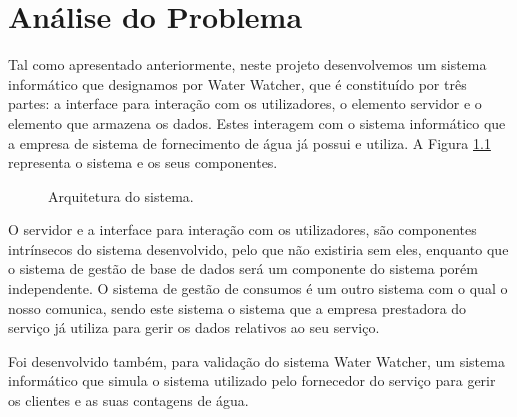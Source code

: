 \chapter{Análise do Problema} \label{cap:analise}

Tal como apresentado anteriormente, neste projeto desenvolvemos um sistema informático que designamos por Water Watcher, que é constituído por três partes: a interface para interação com os utilizadores, o elemento servidor e o elemento que armazena os dados. Estes interagem com o sistema informático que a empresa de sistema de fornecimento de água já possui e utiliza. A Figura \ref{fig:modelo} representa o sistema e os seus componentes.

\begin{figure}[ht!]
\centering
{}
\caption{Arquitetura do sistema.}
\label{fig:modelo}
\end{figure}

 O servidor e a interface para interação com os utilizadores, são componentes intrínsecos do sistema desenvolvido, pelo que não existiria sem eles, enquanto que o sistema de gestão de base de dados será um componente do sistema porém independente. O sistema de gestão de consumos é um outro sistema com o qual o nosso comunica, sendo este sistema o sistema que a empresa prestadora do serviço já utiliza para gerir os dados relativos ao seu serviço.\par
Foi desenvolvido também, para validação do sistema Water Watcher, um sistema informático que simula o sistema utilizado pelo fornecedor do serviço para gerir os clientes e as suas contagens de água.\par

